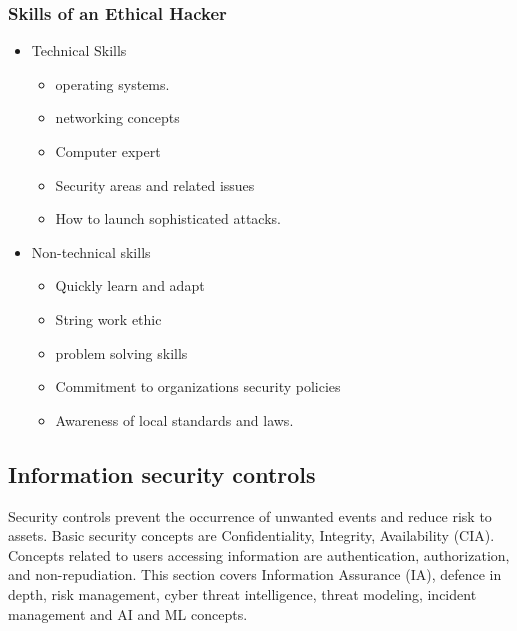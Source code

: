 \subsubsection{Skills of an Ethical Hacker}
\begin{itemize}
    \item Technical Skills
    \begin{itemize}
        \item operating systems.
        \item networking concepts
        \item Computer expert
        \item Security areas and related issues
        \item How to launch sophisticated attacks.
    \end{itemize}
    \item Non-technical skills
    \begin{itemize}
        \item Quickly learn and adapt
        \item String work ethic
        \item problem solving skills
        \item Commitment to organizations security policies
        \item Awareness of local standards and laws.
    \end{itemize}
\end{itemize}

\subsection{Information security controls}
Security controls prevent the occurrence of unwanted events and reduce risk to assets.
Basic security concepts are Confidentiality, Integrity, Availability (CIA).
Concepts related to users accessing information are authentication, authorization, and non-repudiation.
This section covers Information Assurance (IA), defence in depth, risk management, cyber threat intelligence, threat modeling, incident management and AI and ML concepts.